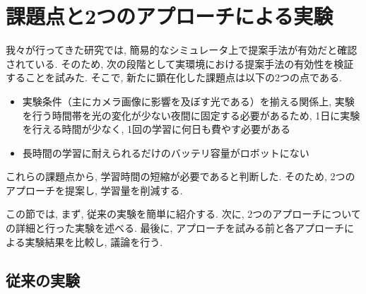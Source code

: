 
\section{課題点と2つのアプローチによる実験}
我々が行ってきた研究では, 簡易的なシミュレータ上で提案手法が有効だと確認されている. そのため, 次の段階として実環境における提案手法の有効性を検証することを試みた. そこで, 新たに顕在化した課題点は以下の2つの点である.

\begin{itemize}
  \item 実験条件（主にカメラ画像に影響を及ぼす光である）を揃える関係上, 実験を行う時間帯を光の変化が少ない夜間に固定する必要があるため, 1日に実験を行える時間が少なく, 1回の学習に何日も費やす必要がある
  \item 長時間の学習に耐えられるだけのバッテリ容量がロボットにない
\end{itemize}

これらの課題点から, 学習時間の短縮が必要であると判断した. そのため, 2つのアプローチを提案し, 学習量を削減する.
\par
この節では, まず, 従来の実験を簡単に紹介する. 次に, 2つのアプローチについての詳細と行った実験を述べる. 最後に, アプローチを試みる前と各アプローチによる実験結果を比較し, 議論を行う.

\subsection{従来の実験}

